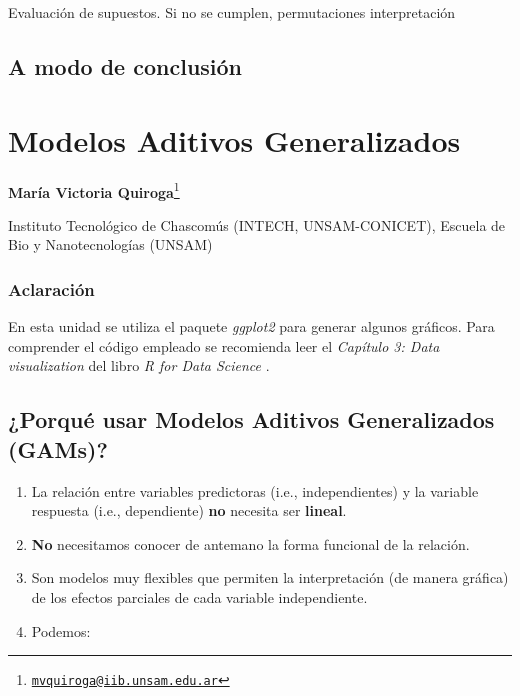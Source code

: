 \documentclass[
]{book}
\providecommand{\tightlist}{%
  \setlength{\itemsep}{0pt}\setlength{\parskip}{0pt}}
\begin{document}
Evaluación de supuestos. Si no se cumplen, permutaciones
interpretación

\hypertarget{a-modo-de-conclusiuxf3n}{%
\section{A modo de conclusión}\label{a-modo-de-conclusiuxf3n}}

\hypertarget{gam}{%
\chapter{Modelos Aditivos Generalizados}\label{gam}}

\textbf{María Victoria Quiroga}\footnote{\href{mailto:mvquiroga@iib.unsam.edu.ar}{\nolinkurl{mvquiroga@iib.unsam.edu.ar}}}

Instituto Tecnológico de Chascomús (INTECH, UNSAM-CONICET), Escuela de Bio y Nanotecnologías (UNSAM)

\hypertarget{aclaraciuxf3n}{%
\subsection{Aclaración}\label{aclaraciuxf3n}}

En esta unidad se utiliza el paquete \emph{ggplot2} \citep{ggplot2} para generar algunos gráficos. Para comprender el código empleado se recomienda leer el \emph{Capítulo 3: Data visualization} del libro \emph{R for Data Science} \citep{wickham2017r}.

\hypertarget{porquuxe9-usar-modelos-aditivos-generalizados-gams}{%
\section{¿Porqué usar Modelos Aditivos Generalizados (GAMs)?}\label{porquuxe9-usar-modelos-aditivos-generalizados-gams}}

\begin{enumerate}
\def\labelenumi{\arabic{enumi}.}
\tightlist
\item
  La relación entre variables predictoras (i.e., independientes) y la variable respuesta (i.e., dependiente) \textbf{no} necesita ser \textbf{lineal}.
\item
  \textbf{No} necesitamos conocer de antemano la forma funcional de la relación.
\item
  Son modelos muy flexibles que permiten la interpretación (de manera gráfica) de los efectos parciales de cada variable independiente.
\item
  Podemos:
\end{enumerate}
\end{document}

